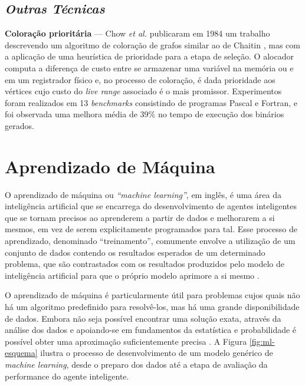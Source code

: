 \documentclass[
	12pt,				%
	openright,			%
	oneside,			%
	a4paper,			%
	tccpreliminar,			%
	]{ABNT-DC-UEL}
\begin{document}
\section{\textit{Outras Técnicas}}

\textbf{Coloração prioritária} --- Chow \textit{et al.} publicaram em 1984 um trabalho descrevendo um algoritmo de coloração de grafos similar ao de Chaitin \cite{chaitin:82}, mas com a aplicação de uma heurística de prioridade para a etapa de seleção. O alocador computa a diferença de custo entre se armazenar uma variável na memória ou e em um registrador físico e, no processo de coloração, é dada prioridade aos vértices cujo custo do \textit{live range} associado é o mais promissor. Experimentos foram realizados em 13 \textit{benchmarks} consistindo de programas Pascal e Fortran, e foi observada uma melhora média de 39\% no tempo de execução dos binários gerados.

\chapter{Aprendizado de Máquina}

O aprendizado de máquina ou \textit{``machine learning''}, em inglês, é uma área da inteligência artificial que se encarrega do desenvolvimento de agentes inteligentes que se tornam precisos ao aprenderem a partir de dados e melhorarem a si mesmos, em vez de serem explicitamente programados para tal. Esse processo de aprendizado, denominado ``treinamento'', comumente envolve a utilização de um conjunto de dados contendo os resultados esperados de um determinado problema, que são contrastados com os resultados produzidos pelo modelo de inteligência artificial para que o próprio modelo aprimore a si mesmo \cite{alzubi:18}.

O aprendizado de máquina é particularmente útil para problemas cujos quais não há um algoritmo predefinido para resolvê-los, mas há uma grande disponibilidade de dados. Embora não seja possível encontrar uma solução exata, através da análise dos dados e apoiando-se em fundamentos da estatística e probabilidade é possível obter uma aproximação suficientemente precisa \cite{alpaydin:20}. A Figura \ref{fig:ml-esquema} ilustra o processo de desenvolvimento de um modelo genérico de \textit{machine learning}, desde o preparo dos dados até a etapa de avaliação da performance do agente inteligente.
\end{document}
